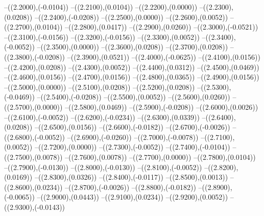 {	--({\sx*(2.2000)},{\sy*(-0.0104)})
	--({\sx*(2.2100)},{\sy*(0.0104)})
	--({\sx*(2.2200)},{\sy*(0.0000)})
	--({\sx*(2.2300)},{\sy*(0.0208)})
	--({\sx*(2.2400)},{\sy*(-0.0208)})
	--({\sx*(2.2500)},{\sy*(0.0000)})
	--({\sx*(2.2600)},{\sy*(0.0052)})
	--({\sx*(2.2700)},{\sy*(0.0104)})
	--({\sx*(2.2800)},{\sy*(0.0417)})
	--({\sx*(2.2900)},{\sy*(0.0260)})
	--({\sx*(2.3000)},{\sy*(-0.0521)})
	--({\sx*(2.3100)},{\sy*(-0.0156)})
	--({\sx*(2.3200)},{\sy*(-0.0156)})
	--({\sx*(2.3300)},{\sy*(0.0052)})
	--({\sx*(2.3400)},{\sy*(-0.0052)})
	--({\sx*(2.3500)},{\sy*(0.0000)})
	--({\sx*(2.3600)},{\sy*(0.0208)})
	--({\sx*(2.3700)},{\sy*(0.0208)})
	--({\sx*(2.3800)},{\sy*(-0.0208)})
	--({\sx*(2.3900)},{\sy*(0.0521)})
	--({\sx*(2.4000)},{\sy*(-0.0625)})
	--({\sx*(2.4100)},{\sy*(0.0156)})
	--({\sx*(2.4200)},{\sy*(0.0208)})
	--({\sx*(2.4300)},{\sy*(0.0052)})
	--({\sx*(2.4400)},{\sy*(0.0312)})
	--({\sx*(2.4500)},{\sy*(0.0469)})
	--({\sx*(2.4600)},{\sy*(0.0156)})
	--({\sx*(2.4700)},{\sy*(0.0156)})
	--({\sx*(2.4800)},{\sy*(0.0365)})
	--({\sx*(2.4900)},{\sy*(0.0156)})
	--({\sx*(2.5000)},{\sy*(0.0000)})
	--({\sx*(2.5100)},{\sy*(0.0208)})
	--({\sx*(2.5200)},{\sy*(0.0208)})
	--({\sx*(2.5300)},{\sy*(-0.0469)})
	--({\sx*(2.5400)},{\sy*(-0.0208)})
	--({\sx*(2.5500)},{\sy*(0.0052)})
	--({\sx*(2.5600)},{\sy*(0.0260)})
	--({\sx*(2.5700)},{\sy*(0.0000)})
	--({\sx*(2.5800)},{\sy*(0.0469)})
	--({\sx*(2.5900)},{\sy*(-0.0208)})
	--({\sx*(2.6000)},{\sy*(0.0026)})
	--({\sx*(2.6100)},{\sy*(-0.0052)})
	--({\sx*(2.6200)},{\sy*(-0.0234)})
	--({\sx*(2.6300)},{\sy*(0.0339)})
	--({\sx*(2.6400)},{\sy*(0.0208)})
	--({\sx*(2.6500)},{\sy*(0.0156)})
	--({\sx*(2.6600)},{\sy*(-0.0182)})
	--({\sx*(2.6700)},{\sy*(-0.0026)})
	--({\sx*(2.6800)},{\sy*(-0.0052)})
	--({\sx*(2.6900)},{\sy*(-0.0260)})
	--({\sx*(2.7000)},{\sy*(-0.0078)})
	--({\sx*(2.7100)},{\sy*(0.0052)})
	--({\sx*(2.7200)},{\sy*(0.0000)})
	--({\sx*(2.7300)},{\sy*(-0.0052)})
	--({\sx*(2.7400)},{\sy*(-0.0104)})
	--({\sx*(2.7500)},{\sy*(0.0078)})
	--({\sx*(2.7600)},{\sy*(0.0078)})
	--({\sx*(2.7700)},{\sy*(0.0000)})
	--({\sx*(2.7800)},{\sy*(0.0104)})
	--({\sx*(2.7900)},{\sy*(-0.0130)})
	--({\sx*(2.8000)},{\sy*(-0.0130)})
	--({\sx*(2.8100)},{\sy*(-0.0052)})
	--({\sx*(2.8200)},{\sy*(0.0169)})
	--({\sx*(2.8300)},{\sy*(0.0326)})
	--({\sx*(2.8400)},{\sy*(-0.0117)})
	--({\sx*(2.8500)},{\sy*(0.0013)})
	--({\sx*(2.8600)},{\sy*(0.0234)})
	--({\sx*(2.8700)},{\sy*(-0.0026)})
	--({\sx*(2.8800)},{\sy*(-0.0182)})
	--({\sx*(2.8900)},{\sy*(-0.0065)})
	--({\sx*(2.9000)},{\sy*(0.0443)})
	--({\sx*(2.9100)},{\sy*(0.0234)})
	--({\sx*(2.9200)},{\sy*(0.0052)})
	--({\sx*(2.9300)},{\sy*(-0.0143)})
}
